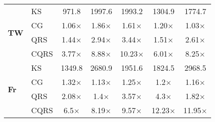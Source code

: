 \begin{table}[!t]
{\begin{tabular}{|l|l||c|c|c|c|c|}
\multirow{4}{*}{\textsf{\textbf{TW}}} &
      \textsc{KS} & 971.8 & 1997.6 & 1993.2 & 1304.9 & 1774.7\\ \cline{2-7}
    & \textsc{CG} & 1.06$\times$ & 1.86$\times$ & 1.61$\times$ & 1.20$\times$ & 1.03$\times$\\ \cline{2-7}
    & \textsc{QRS} & 1.44$\times$ & 2.94$\times$ & 3.44$\times$ & 1.51$\times$ & 2.61$\times$\\ \cline{2-7}
    & \textsc{CQRS} & 3.77$\times$ & 8.88$\times$ & 10.23$\times$ & 6.01$\times$ & 8.25$\times$
    \\ \hline \hline
\multirow{4}{*}{\textsf{\textbf{Fr}}} &
      \textsc{KS} & 1349.8 & 2680.9 & 1951.6 & 1824.5 & 2968.5\\ \cline{2-7}
    & \textsc{CG} & 1.32$\times$ & 1.13$\times$ & 1.25$\times$ & 1.2$\times$ & 1.16$\times$\\ \cline{2-7}
    & \textsc{QRS} & 2.08$\times$ & 1.4$\times$ & 3.57$\times$ & 4.3$\times$ & 1.82$\times$\\ \cline{2-7}
    & \textsc{CQRS} & 6.5$\times$ & 8.19$\times$ & 9.57$\times$ & 12.23$\times$ & 11.95$\times$
    \\ \hline
\end{tabular}
}
\vspace{-0.3in}
\end{table}



